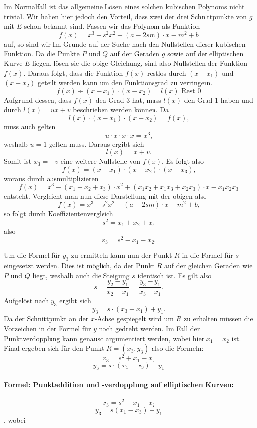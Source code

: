 Im Normalfall ist das allgemeine Lösen eines solchen kubischen Polynoms nicht trivial. Wir haben hier jedoch den Vorteil, dass zwei der drei Schnittpunkte von $g$ mit $E$ schon bekannt sind. Fassen wir das Polynom als Funktion $$f(x) = x^3 - s^2x^2 + (a-2sm)\cdot x - m^2+b$$ auf, so sind wir Im Grunde auf der Suche nach den Nullstellen dieser kubischen Funktion. Da die Punkte $P$ und $Q$ auf der Geraden $g$ sowie auf der elliptischen Kurve $E$ liegen, lösen sie die obige
Gleichung, sind also Nullstellen der Funktion $f(x)$. Daraus folgt, dass die Funktion $f(x)$ restlos durch $(x-x_1)$ und $(x-x_2)$ geteilt werden kann um den Funktionsgrad zu verringern.
$$f(x) \div (x-x_1) \cdot (x-x_2) = l(x) \text{  Rest }0$$
Aufgrund dessen, dass $f(x)$ den Grad 3 hat, muss $l(x)$ den Grad 1 haben und durch $l(x) = ux + v$ beschrieben werden können. Da $$l(x) \cdot (x-x_1) \cdot (x-x_2) = f(x)\text{,}$$ muss auch gelten $$u \cdot x \cdot x \cdot x  = x^3\text{,}$$ weshalb $u = 1$ gelten muss. Daraus ergibt sich $$l(x) = x + v \text{.}$$ Somit ist $x_3 = -v$ eine weitere Nullstelle von $f(x)$. Es folgt also $$f(x) = (x-x_1) \cdot (x-x_2) \cdot (x-x_3) \text{,}$$ woraus durch ausmultiplizieren $$f(x) = x^3 - (x_1 + x_2 + x_3) \cdot x^2 + (x_1 x_2 + x_1 x_3 + x_2 x_3) \cdot x - x_1 x_2 x_3$$ entsteht. Vergleicht man nun diese Darstellung mit der obigen also $$f(x) = x^3 - s^2x^2 + (a-2sm)\cdot x - m^2+b\text{,}$$ so folgt durch Koeffizientenvergleich $$s^2 = x_1 + x_2 +x_3$$ also $$x_3 = s^2 -x_1 - x_2.$$

Um die Formel für $y_3$ zu ermitteln kann nun der Punkt $R$ in die Formel für $s$ eingesetzt werden. Dies ist möglich, da der Punkt $R$ auf der gleichen Geraden wie $P$ und $Q$ liegt, weshalb auch die Steigung $s$ identisch ist.
Es gilt also $$s = \frac{y_2 - y_1}{x_2  - x_1} = \frac{y_3 - y_1}{x_3  - x_1}.$$ 
Aufgelöst nach $y_3$ ergibt sich $$y_3 = s \cdot (x_3 - x_1) + y_1 \text{.}$$
Da der Schnittpunkt an der $x$-Achse gespiegelt wird um $R$ zu erhalten müssen die Vorzeichen in der Formel für $y$ noch gedreht werden. Im Fall der Punktverdopplung kann genauso argumentiert werden, wobei hier $x_1 = x_2$ ist. Final ergeben sich für den Punkt $R = (x_3, y_3)$ also die Formeln:
$$x_3 = s^2 + x_1 - x_2$$
$$y_3 = s \cdot (x_1 - x_3) - y_1$$


\paragraph{Formel: Punktaddition und -verdopplung auf elliptischen Kurven\cite[278]{Paar.2016}:}
$$x_3 = s^2 - x_1 - x_2$$
$$y_3 = s(x_1 - x_3) - y_1$$,
wobei

